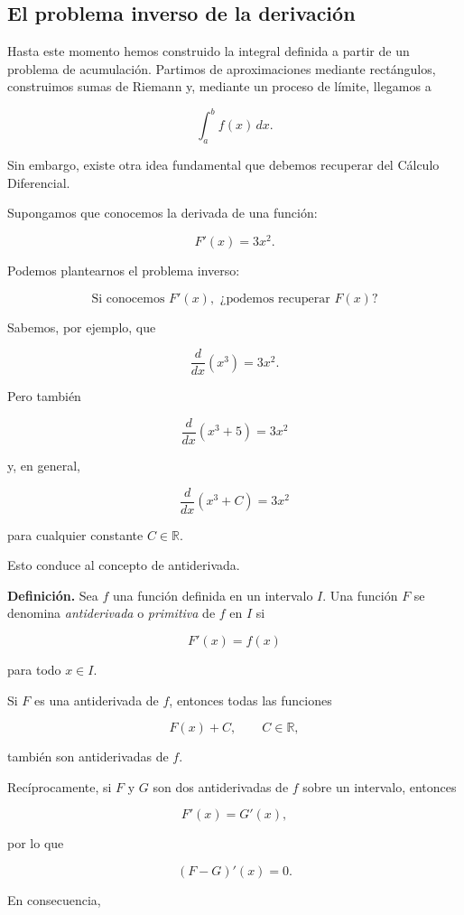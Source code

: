 \documentclass[12pt]{article}
\begin{document}
\subsection{El problema inverso de la derivación}

Hasta este momento hemos construido la integral definida a partir de un
problema de acumulación. Partimos de aproximaciones mediante rectángulos,
construimos sumas de Riemann y, mediante un proceso de límite, llegamos a

\[
\int_a^b f(x)\,dx.
\]

Sin embargo, existe otra idea fundamental que debemos recuperar del
Cálculo Diferencial.

Supongamos que conocemos la derivada de una función:

\[
F'(x)=3x^2.
\]

Podemos plantearnos el problema inverso:

\[
\boxed{
\text{Si conocemos }F'(x),\text{ ¿podemos recuperar }F(x)?
}
\]

Sabemos, por ejemplo, que

\[
\frac{d}{dx}(x^3)=3x^2.
\]

Pero también

\[
\frac{d}{dx}(x^3+5)=3x^2
\]

y, en general,

\[
\frac{d}{dx}(x^3+C)=3x^2
\]

para cualquier constante $C\in\mathbb{R}$.

Esto conduce al concepto de antiderivada.

\textbf{Definición.}
Sea $f$ una función definida en un intervalo $I$. Una función $F$ se
denomina \emph{antiderivada} o \emph{primitiva} de $f$ en $I$ si

\[
F'(x)=f(x)
\]

para todo $x\in I$.

Si $F$ es una antiderivada de $f$, entonces todas las funciones

\[
F(x)+C,
\qquad C\in\mathbb{R},
\]

también son antiderivadas de $f$.

Recíprocamente, si $F$ y $G$ son dos antiderivadas de $f$ sobre un
intervalo, entonces

\[
F'(x)=G'(x),
\]

por lo que

\[
(F-G)'(x)=0.
\]

En consecuencia,
\end{document}
